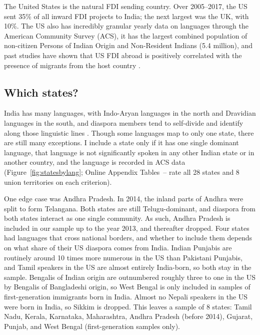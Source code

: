 \documentclass[12pt]{article}
\begin{document}
The United States is the natural FDI sending country. Over 2005--2017, the US sent 35\% of all inward FDI projects to India; the next largest was the UK, with 10\%. The US also has incredibly granular yearly data on languages through the American Community Survey (ACS), it has the largest combined population of non-citizen Persons of Indian Origin and Non-Resident Indians (5.4 million), and past studies have shown that US FDI abroad is positively correlated with the presence of migrants from the host country \citep{javorcik_migrant_2011}.

\subsection{Which states?}

India has many languages, with Indo-Aryan languages in the north and Dravidian languages in the south, and diaspora members tend to self-divide and identify along those linguistic lines \citep{sahoo_issues_2006, gautam_indian_2013}. Though some languages map to only one state, there are still many exceptions. I include a state only if it has one single dominant language, that language is not significantly spoken in any other Indian state or in another country, and the language is recorded in ACS data (Figure~\ref{fig:statesbylang}; Online Appendix Tables~-- rate all 28 states and 8 union territories on each criterion).

One edge case was Andhra Pradesh. In 2014, the inland parts of Andhra were split to form Telangana. Both states are still Telugu-dominant, and diaspora from both states interact as one single community. As such, Andhra Pradesh is included in our sample up to the year 2013, and thereafter dropped. Four states had languages that cross national borders, and whether to include them depends on what share of their US diaspora comes from India. Indian Punjabis are routinely around 10 times more numerous in the US than Pakistani Punjabis, and Tamil speakers in the US are almost entirely India-born, so both stay in the sample. Bengalis of Indian origin are outnumbered roughly three to one in the US by Bengalis of Bangladeshi origin, so West Bengal is only included in samples of first-generation immigrants born in India. Almost no Nepali speakers in the US were born in India, so Sikkim is dropped. This leaves a sample of 8 states: Tamil Nadu, Kerala, Karnataka, Maharashtra, Andhra Pradesh (before 2014), Gujarat, Punjab, and West Bengal (first-generation samples only).
\end{document}
